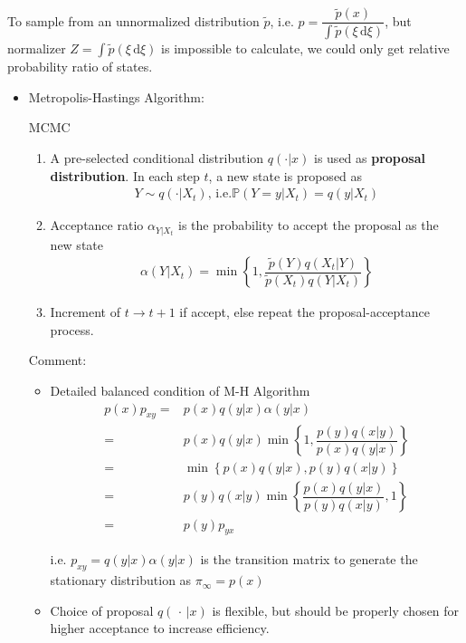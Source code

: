     To sample from an unnormalized distribution $ \tilde{p} $, i.e. $ p=\dfrac{\tilde{p}(x)}{\int \tilde{p}(\xi \,\mathrm{d}\xi)} $, but normalizer $ Z=\int \tilde{p}(\xi \,\mathrm{d}\xi) $ is impossible to calculate, we could only get relative probability ratio of states.



\begin{itemize}[topsep=2pt,itemsep=0pt]
    \item Metropolis-Hastings Algorithm:
    \begin{algorithm}{MCMC}
    \begin{enumerate}[topsep=2pt,itemsep=2pt]
        \item A pre-selected conditional distribution $ q(\cdot|x) $ is used as \textbf{proposal distribution}. In each step $ t $, a new state is proposed as 
        \begin{align}
            Y\sim q(\cdot|X_t), \,\mathrm{i.e. }\mathbb{P}\left( Y=y|X_t \right) =q(y|X_t)
        \end{align}
        \item Acceptance ratio $ \alpha_{Y|X_t}  $ is the probability to accept the proposal as the new state
        \begin{align}
            \alpha (Y|X_t)= \min\left\{ 1,\dfrac{\tilde{p}(Y)q(X_t|Y)}{\tilde{p}(X_t)q(Y|X_t)} \right\}
        \end{align}
        \item Increment of $ t\to t+1 $ if accept, else repeat the proposal-acceptance process.
    \end{enumerate}

    \end{algorithm}
        

    Comment: 
    \begin{itemize}[topsep=2pt,itemsep=0pt]
        \item Detailed balanced condition of M-H Algorithm
\begin{align}
    p(x)p_{xy}=&p(x)q(y|x)\alpha (y|x)\\
    =& p(x)q(y|x)\min\left\{ 1,\dfrac{p(y)q(x|y)}{p(x)q(y|x)} \right\}\\
    =&\min\left\{p(x)q(y|x), p(y)q(x|y)\right\}\\
    =&p(y)q(x|y)\min\left\{\dfrac{p(x)q(y|x)}{p(y)q(x|y)},1 \right\}\\
    =&p(y)p_{yx}
\end{align}

    i.e. $ p_{xy}=q(y|x)\alpha (y|x) $ is the transition matrix to generate the stationary distribution as $ \pi_{\infty}=p(x) $
    \item Choice of proposal $ q(\, \cdot \, |x) $ is flexible, but should be properly chosen for higher acceptance to increase efficiency. 
    \end{itemize}
    
    
    
        
\end{itemize}

